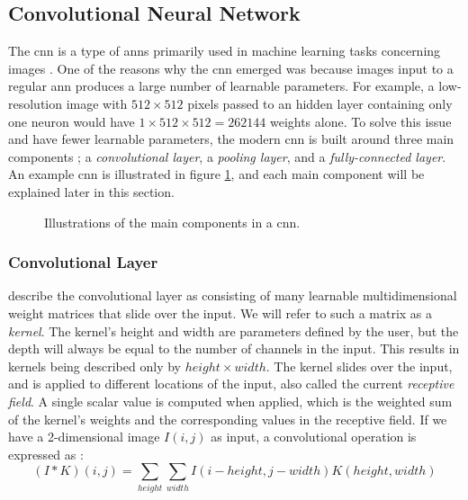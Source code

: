 \subsection{Convolutional Neural Network} \label{cnn}
    The \gls{cnn} is a type of \gls{ann}s primarily used in machine learning tasks concerning images \cite{o2015introduction_convolutions}. One of the reasons why the \gls{cnn} emerged was because images input to a regular \gls{ann} produces a large number of learnable parameters. For example, a low-resolution image with $512\times512$ pixels passed to an hidden layer containing only one neuron would have $1\times512\times512 = 262144$ weights alone.  To solve this issue and have fewer learnable parameters, the modern \gls{cnn} is built around three main components \cite{o2015introduction_convolutions}; a \textit{convolutional layer}, a \textit{pooling layer}, and a \textit{fully-connected layer}. An example \gls{cnn} is illustrated in figure \ref{convolutional_neural_network_fig}, and each main component will be explained later in this section.

    \begin{figure}[H]
        \centering
                        
        \caption[Convolutional neural network example]{Illustrations of the main components in a \gls{cnn}.}
      	\medskip 
        \label{convolutional_neural_network_fig}
    \end{figure}



    \subsubsection{Convolutional Layer}
    
    
     \citeauthor{o2015introduction_convolutions} \cite{o2015introduction_convolutions} describe the convolutional layer as consisting of many learnable multidimensional weight matrices that slide over the input. We will refer to such a matrix as a \textit{kernel}. The kernel's height and width are parameters defined by the user, but the depth will always be equal to the number of channels in the input. This results in kernels being described only by $height \times width$. The kernel slides over the input, and is applied to different locations of the input, also called the current \textit{receptive field}. A single scalar value is computed when applied, which is the weighted sum of the kernel's weights and the corresponding values in the receptive field. If we have a 2-dimensional image $I(i,j)$ as input, a convolutional operation is expressed as \cite{Goodfellow-et-al-2016}:
        \begin{equation}
            (I*K)(i,j) = \sum_{height}\sum_{width}I(i-height,j-width)K(height,width)
        \end{equation}
     
